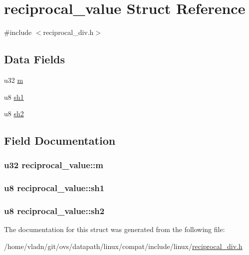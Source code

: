 \hypertarget{structreciprocal__value}{}\section{reciprocal\+\_\+value Struct Reference}
\label{structreciprocal__value}


{\ttfamily \#include $<$reciprocal\+\_\+div.\+h$>$}

\subsection*{Data Fields}
\begin{DoxyCompactItemize}
\item 
u32 \hyperlink{structreciprocal__value_aa32a30f86412446e8febcc66236f7472}{m}
\item 
u8 \hyperlink{structreciprocal__value_a0154478c74b1c1d15bddd2adabfca9e1}{sh1}
\item 
u8 \hyperlink{structreciprocal__value_aada545b593c9abb69094dfb9b074f61e}{sh2}
\end{DoxyCompactItemize}


\subsection{Field Documentation}
\hypertarget{structreciprocal__value_aa32a30f86412446e8febcc66236f7472}{}
\subsubsection[{m}]{\setlength{\rightskip}{0pt plus 5cm}u32 reciprocal\+\_\+value\+::m}\label{structreciprocal__value_aa32a30f86412446e8febcc66236f7472}
\hypertarget{structreciprocal__value_a0154478c74b1c1d15bddd2adabfca9e1}{}
\subsubsection[{sh1}]{\setlength{\rightskip}{0pt plus 5cm}u8 reciprocal\+\_\+value\+::sh1}\label{structreciprocal__value_a0154478c74b1c1d15bddd2adabfca9e1}
\hypertarget{structreciprocal__value_aada545b593c9abb69094dfb9b074f61e}{}
\subsubsection[{sh2}]{\setlength{\rightskip}{0pt plus 5cm}u8 reciprocal\+\_\+value\+::sh2}\label{structreciprocal__value_aada545b593c9abb69094dfb9b074f61e}


The documentation for this struct was generated from the following file\+:\begin{DoxyCompactItemize}
\item 
/home/vladn/git/ovs/datapath/linux/compat/include/linux/\hyperlink{reciprocal__div_8h}{reciprocal\+\_\+div.\+h}\end{DoxyCompactItemize}
